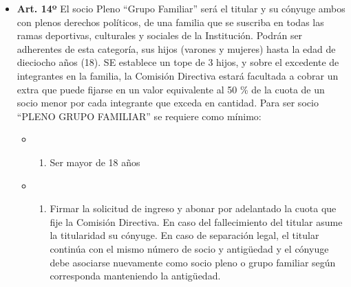 \documentclass[]{book}
\providecommand{\tightlist}{%
  \setlength{\itemsep}{0pt}\setlength{\parskip}{0pt}}
\begin{document}
\begin{itemize}
\tightlist
\item
  \textbf{Art. 14º} El socio Pleno ``Grupo Familiar'' será el titular y
  su cónyuge ambos con plenos derechos políticos, de una familia que se
  suscriba en todas las ramas deportivas, culturales y sociales de la
  Institución. Podrán ser adherentes de esta categoría, sus hijos
  (varones y mujeres) hasta la edad de dieciocho años (18). SE establece
  un tope de 3 hijos, y sobre el excedente de integrantes en la familia,
  la Comisión Directiva estará facultada a cobrar un extra que puede
  fijarse en un valor equivalente al 50 \% de la cuota de un socio menor
  por cada integrante que exceda en cantidad. Para ser socio ``PLENO
  GRUPO FAMILIAR'' se requiere como mínimo:

  \begin{itemize}
  \item
    \begin{enumerate}
    \def\labelenumi{\alph{enumi})}
    \tightlist
    \item
      Ser mayor de 18 años
    \end{enumerate}
  \item
    \begin{enumerate}
    \def\labelenumi{\alph{enumi})}
    \setcounter{enumi}{1}
    \tightlist
    \item
      Firmar la solicitud de ingreso y abonar por adelantado la cuota
      que fije la Comisión Directiva. En caso del fallecimiento del
      titular asume la titularidad su cónyuge. En caso de separación
      legal, el titular continúa con el mismo número de socio y
      antigüedad y el cónyuge debe asociarse nuevamente como socio pleno
      o grupo familiar según corresponda manteniendo la antigüedad.
    \end{enumerate}
  \end{itemize}
\end{itemize}
\end{document}
